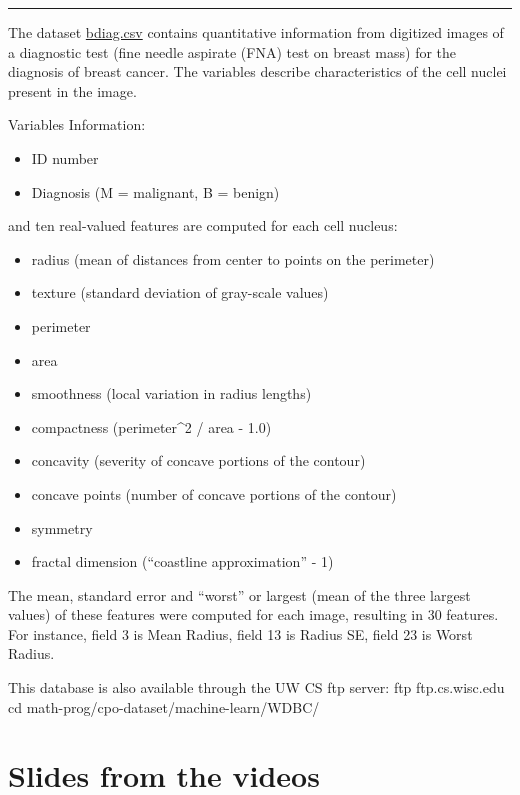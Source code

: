 \documentclass[
]{book}
\providecommand{\tightlist}{%
  \setlength{\itemsep}{0pt}\setlength{\parskip}{0pt}}
\begin{document}
\begin{center}\rule{0.5\linewidth}{0.5pt}\end{center}

The dataset \href{https://www.dropbox.com/s/vp44yozebx5xgok/bdiag.csv?dl=1}{bdiag.csv}
contains quantitative information from digitized images of a diagnostic test
(fine needle aspirate (FNA) test on breast mass) for the diagnosis of breast
cancer. The variables describe characteristics of the cell nuclei present in
the image.

Variables Information:

\begin{itemize}
\tightlist
\item
  ID number
\item
  Diagnosis (M = malignant, B = benign)
\end{itemize}

and ten real-valued features are computed for each cell nucleus:

\begin{itemize}
\tightlist
\item
  radius (mean of distances from center to points on the perimeter)
\item
  texture (standard deviation of gray-scale values)
\item
  perimeter
\item
  area
\item
  smoothness (local variation in radius lengths)
\item
  compactness (perimeter\^{}2 / area - 1.0)
\item
  concavity (severity of concave portions of the contour)
\item
  concave points (number of concave portions of the contour)
\item
  symmetry
\item
  fractal dimension (``coastline approximation'' - 1)
\end{itemize}

The mean, standard error and ``worst'' or largest (mean of the three
largest values) of these features were computed for each image,
resulting in 30 features. For instance, field 3 is Mean Radius, field
13 is Radius SE, field 23 is Worst Radius.

This database is also available through the UW CS ftp server:
ftp ftp.cs.wisc.edu
cd math-prog/cpo-dataset/machine-learn/WDBC/

\section*{Slides from the videos}\label{slides-from-the-videos}
\end{document}
